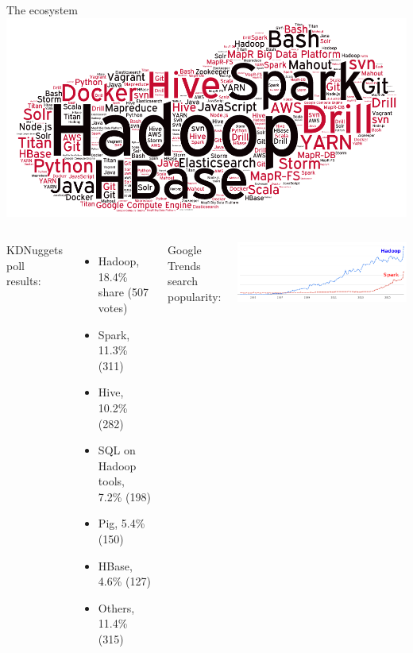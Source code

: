 \documentclass{beamer}
\begin{document}
\vfill
\begin{frame}{The ecosystem}
\vspace{-0.75 cm}
\includegraphics[width=\linewidth]{word-cloud-07-2014.png}

\begin{columns}
KDNuggets poll results:
{\scriptsize
\begin{itemize}
\item Hadoop, 18.4\% share (507 votes)
\item Spark, 11.3\% (311)
\item Hive, 10.2\% (282)
\item SQL on Hadoop tools, 7.2\% (198)
\item Pig, 5.4\% (150)
\item HBase, 4.6\% (127)
\item Others, 11.4\% (315)
\end{itemize}}

Google Trends search popularity:

\vspace{0.5 cm}
\includegraphics[width=\linewidth]{trends.png}
\end{columns}
\end{frame}





\end{document}
